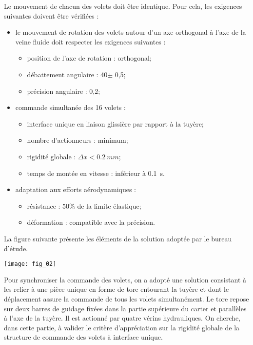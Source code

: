Le mouvement de chacun des volets doit être identique. Pour cela, les exigences suivantes doivent être vérifiées :
\begin{itemize}
\item le mouvement de rotation des volets autour d'un axe orthogonal à l'axe de la veine fluide doit respecter les exigences suivantes : 
\begin{itemize}
\item position de l'axe de rotation : orthogonal;
\item débattement angulaire : 40\degres $\pm$ 0,5\degres;
\item précision angulaire : 0,2\degres;
\end{itemize}
\item commande simultanée des 16 volets :
\begin{itemize}
\item interface unique en liaison glissière par rapport à la tuyère;
\item nombre d'actionneurs : minimum;
\item rigidité globale : $\Delta x < \SI{0,2}{mm}$;
\item temps de montée en vitesse : inférieur à \SI{0,1}{s}.
\end{itemize}
\item adaptation aux efforts aérodynamiques :
\begin{itemize}
\item résistance : 50\% de la limite élastique;
\item déformation : compatible avec la précision.
\end{itemize}
\end{itemize}


La figure suivante présente les éléments de la solution adoptée par le bureau d'étude.
\begin{center}
\texttt{[image: fig\_02]}
\end{center}

Pour synchroniser la commande des volets, on a adopté une solution consistant à les relier à une pièce unique
en forme de tore entourant la tuyère et dont le déplacement assure la commande de tous les volets
simultanément. Le tore repose sur deux barres de guidage fixées dans la partie supérieure du carter et
parallèles à l'axe de la tuyère. Il est actionné par quatre vérins hydrauliques.
On cherche, dans cette partie, à valider le critère d'appréciation sur la rigidité globale de la structure de
commande des volets à interface unique.


